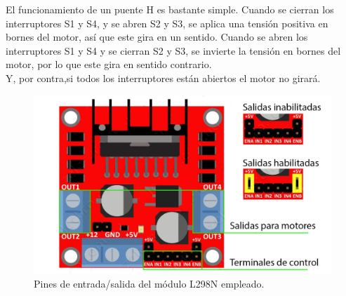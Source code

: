 El funcionamiento de un puente H es  bastante  simple. Cuando se cierran los interruptores S1 y S4, y se abren S2 y S3, se aplica una tensión positiva en bornes del motor, así 
que este gira en un sentido. Cuando se abren los interruptores S1 y S4 y se cierran S2 y S3, se invierte la tensión en bornes del motor, por lo que este gira en sentido contrario.\\

Y, por contra,si todos los interruptores están abiertos el motor no girará. \\



\begin{figure}[H]
  \begin{center}
    \includegraphics[scale=2]{imagenes/L298N-conexiones.jpg}
  \end{center}
  \caption{Pines de entrada/salida del módulo L298N empleado.}
  \label{diagrama:L298N-salidas}
\end{figure}


